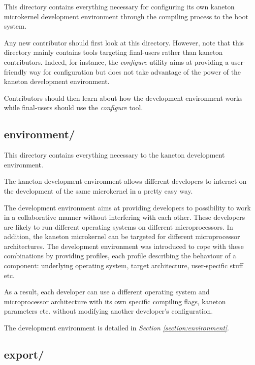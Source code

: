 This directory contains everything necessary for configuring its own
kaneton microkernel development environment through the compiling process
to the boot system.

Any new contributor should first look at this directory. However, note that
this directory mainly contains tools targeting final-users rather than
kaneton contributors. Indeed, for instance, the \textit{configure} utility
aims at providing a user-friendly way for configuration but does not take
advantage of the power of the kaneton development environment.

Contributors should then learn about how the development environment works
while final-users should use the \textit{configure} tool.

%
%

\subsection*{environment/}

This directory contains everything necessary to the kaneton development
environment.

The kaneton development environment allows different developers to
interact on the development of the same microkernel in a pretty easy way.

The development environment aims at providing developers to possibility to
work in a collaborative manner without interfering with each other. These
developers are likely to run different operating systems on different
microprocessors. In addition, the kaneton microkernel can be targeted for
different microprocessor architectures. The development environment was
introduced to cope with these combinations by providing profiles, each
profile describing the behaviour of a component: underlying operating system,
target architecture, user-specific stuff etc.

As a result, each developer can use a different operating system and
microprocessor architecture with its own specific compiling flags, kaneton
parameters etc. without modifying another developer's configuration.

The development environment is detailed in \textit{Section
\ref{section:environment}}.

%
%

\subsection*{export/}

